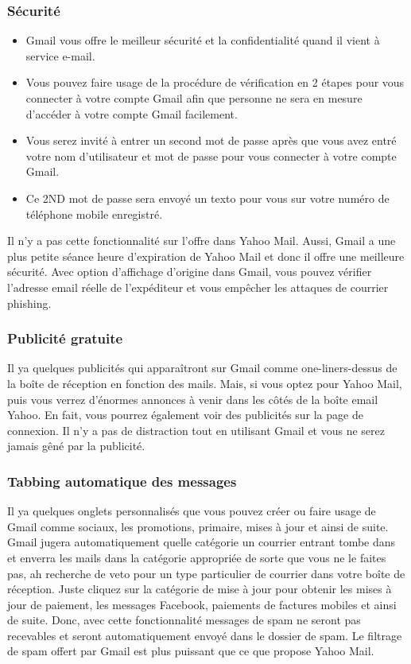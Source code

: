 \documentclass[french]{report}
\begin{document}
\begin{titlepage}
\subsubsection{\LARGE Sécurité}
\begin{itemize}
\LARGE
\item Gmail vous offre le meilleur sécurité et la confidentialité quand il vient à service e-mail.
\item Vous pouvez faire usage de la procédure de vérification en 2 étapes pour vous connecter à votre compte Gmail afin que personne ne sera en mesure d'accéder à votre compte Gmail facilement.
\item Vous serez invité à entrer un second mot de passe après que vous avez entré votre nom d'utilisateur et mot de passe pour vous connecter à votre compte Gmail.
\item Ce 2ND mot de passe sera envoyé un texto pour vous sur votre numéro de téléphone mobile enregistré.
\end{itemize}
\LARGE Il n'y a pas cette fonctionnalité sur l'offre dans Yahoo Mail. Aussi, Gmail a une plus petite séance heure d'expiration de Yahoo Mail et donc il offre une meilleure sécurité. Avec option d'affichage d'origine dans Gmail, vous pouvez vérifier l'adresse email réelle de l'expéditeur et vous empêcher les attaques de courrier phishing.
\subsubsection{\LARGE Publicité gratuite}
\LARGE Il ya quelques publicités qui apparaîtront sur Gmail comme one-liners-dessus de la boîte de réception en fonction des mails. Mais, si vous optez pour Yahoo Mail, puis vous verrez d'énormes annonces à venir dans les côtés de la boîte email Yahoo. En fait, vous pourrez également voir des publicités sur la page de connexion. Il n'y a pas de distraction tout en utilisant Gmail et vous ne serez jamais gêné par la publicité.
\subsubsection{\LARGE Tabbing automatique des messages}
\LARGE Il ya quelques onglets personnalisés que vous pouvez créer ou faire usage de Gmail comme sociaux, les promotions, primaire, mises à jour et ainsi de suite. Gmail jugera automatiquement quelle catégorie un courrier entrant tombe dans et enverra les mails dans la catégorie appropriée de sorte que vous ne le faites pas, ah recherche de veto pour un type particulier de courrier dans votre boîte de réception. Juste cliquez sur la catégorie de mise à jour pour obtenir les mises à jour de paiement, les messages Facebook, paiements de factures mobiles et ainsi de suite. Donc, avec cette fonctionnalité messages de spam ne seront pas recevables et seront automatiquement envoyé dans le dossier de spam. Le filtrage de spam offert par Gmail est plus puissant que ce que propose Yahoo Mail.

\end{titlepage}
\end{document}
